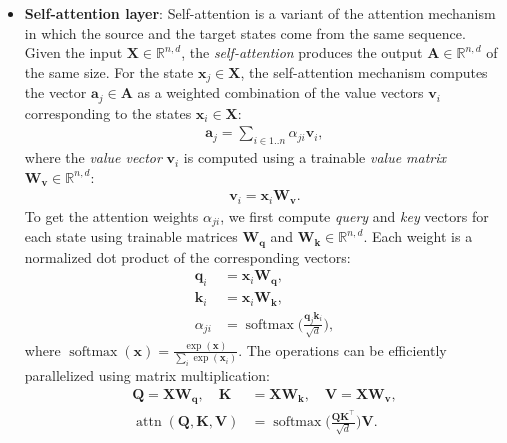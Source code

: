{\begin{itemize}
    \item \textbf{Self-attention layer}: Self-attention \cite{cheng2016long,vaswani2017attention} is a variant of the attention mechanism in which the source and the target states come from the same sequence. Given the input $\mathbf{X} \in \mathbb{R}^{n,d}$, the \emph{self-attention} produces the output $\mathbf{A} \in \mathbb{R}^{n,d}$ of the same size. For the state $\mathbf{x}_j \in \mathbf{X}$, the self-attention mechanism computes the vector $\mathbf{a}_j \in \mathbf{A}$ as a weighted combination of the value vectors $\mathbf{v}_i$ corresponding to the states $\mathbf{x}_i \in \mathbf{X}$:
          \begin{align}
              \mathbf{a}_j = \sum_{i\in 1..n} \alpha_{ji} \mathbf{v}_i,
          \end{align}
          where the \emph{value vector} $\mathbf{v}_i$ is computed using a trainable \emph{value matrix} $\mathbf{W_v} \in \mathbb{R}^{n,d}$:
          \begin{align}
              \mathbf{v}_i = \mathbf{x}_i \mathbf{W_v}.
          \end{align}
          To get the attention weights $\alpha_{ji}$, we first compute \textit{query} and \textit{key} vectors for each state using trainable matrices $\mathbf{W_q}$ and $\mathbf{W_k} \in \mathbb{R}^{n,d}$. Each weight is a normalized dot product of the corresponding vectors:
          \begin{align}
              \mathbf{q}_i & = \mathbf{x}_i \mathbf{W_q},                                                     \\
              \mathbf{k}_i & = \mathbf{x}_i \mathbf{W_k},                                                     \\
              \alpha_{ji}  & = \operatorname{softmax}\biggl(\frac{\mathbf{q}_j\mathbf{k}_i}{\sqrt{d}}\biggr),
          \end{align}
          where $\operatorname{softmax}(\mathbf{x}) = \frac{\exp(\mathbf{x})}{\sum_i \exp(\mathbf{x}_i)}$. The operations can be efficiently parallelized using matrix multiplication:
          \begin{align}
              \mathbf{Q}                                             = \mathbf{X}\mathbf{W_q},\quad\mathbf{K} & = \mathbf{X}\mathbf{W_k},\quad\mathbf{V} = \mathbf{X}\mathbf{W_v},                          \\
              \operatorname{attn}(\mathbf{Q}, \mathbf{K}, \mathbf{V})                                         & = \operatorname{softmax}\biggl(\frac{\mathbf{Q}\mathbf{K}^\top}{\sqrt{d}}\biggr)\mathbf{V}.

\end{align}
\end{itemize}}
